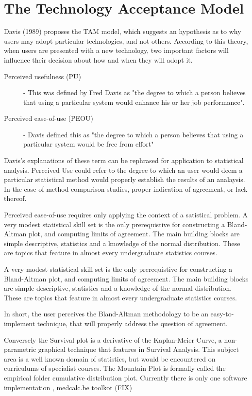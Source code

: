 \documentclass[MAIN.tex]{subfiles}
\begin{document}
\section{The Technology Acceptance Model}
Davis (1989) proposes the TAM model, which suggests an hypothesis as to why users may adopt particular technologies, and not others. 
According to this theory, when users are presented with a new 
technology, two important factors will influence their decision about how and when they will adopt it.
\begin{description}
	\item[Perceived usefulness (PU)] - This was defined by Fred Davis as "the degree to which a person believes that using a particular system would enhance his or her job performance".
	\item[Perceived ease-of-use (PEOU)] - Davis defined this as "the degree to which a person believes that using a particular system would be free from effort" 
\end{description}

Davis's explanations of these term can be rephrased for application to statistical analysis. 
Perceived Use could refer to the degree to which an user would deem a particular statistical method would properly establish the results of an analaysis. In the case of method comparison studies, proper indication of agreement, or lack thereof.


Perceived ease-of-use requires only applying the context of a satistical problem. A very modest statistical skill set is the only prerequistive for constructing a Bland-Altman plot, and computing limits of agreement. The main building blocks 
are simple descriptive, statistics and a knowledge of the normal distribution. These are topics that feature in almost every undergraduate statistics courses.



A very modest statistical skill set is the only prerequistive for constructing a Bland-Altman plot, and computing limits of agreement. The main building blocks 
are simple descriptive, statistics and a knowledge of the normal distribution. These are topics that feature in almost every undergraduate statistics courses.

In short, the user perceives the Bland-Altman methodology to be an easy-to-implement technique, that will properly address the question of agreement.

Conversely the Survival plot is a derivative of the Kaplan-Meier Curve, a non-parametric graphical technique that features in Survival Analysis. This subject area is a well known domain of statistics, but would be encountered 
on curriculums of specialist courses. The Mountain Plot is formally called the empirical folder cumulative distribution plot. 
Currently there is only one software implementation , medcalc.be toolkot (FIX)
\end{document}
